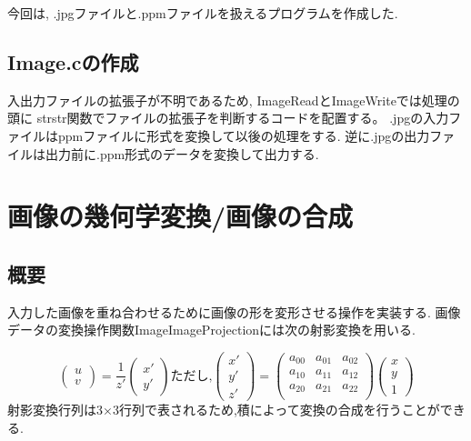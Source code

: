\documentclass[a4j]{jarticle}
\begin{document}
今回は, .jpgファイルと.ppmファイルを扱えるプログラムを作成した.

\subsection{Image.cの作成}
入出力ファイルの拡張子が不明であるため, ImageReadとImageWriteでは処理の頭に
strstr関数でファイルの拡張子を判断するコードを配置する。
.jpgの入力ファイルはppmファイルに形式を変換して以後の処理をする.
逆に.jpgの出力ファイルは出力前に.ppm形式のデータを変換して出力する.


\section{画像の幾何学変換/画像の合成}

\subsection{概要}
入力した画像を重ね合わせるために画像の形を変形させる操作を実装する.
画像データの変換操作関数ImageImageProjectionには次の射影変換を用いる.

\begin{equation}
  \begin{pmatrix}
    u\\v
  \end{pmatrix}
  =\frac{1}{z'}
  \begin{pmatrix}
    x'\\y'
  \end{pmatrix}
  \mbox{ただし,}
  \begin{pmatrix}
    x'\\y'\\z'
  \end{pmatrix}
  =
  \begin{pmatrix}
    a_{00} &a_{01} &a_{02}\\
    a_{10} &a_{11} &a_{12}\\
    a_{20} &a_{21} &a_{22}\\
  \end{pmatrix}
  \begin{pmatrix}
    x\\y\\1
  \end{pmatrix}
\end{equation}
射影変換行列は3×3行列で表されるため,積によって変換の合成を行うことができる.
\end{document}
